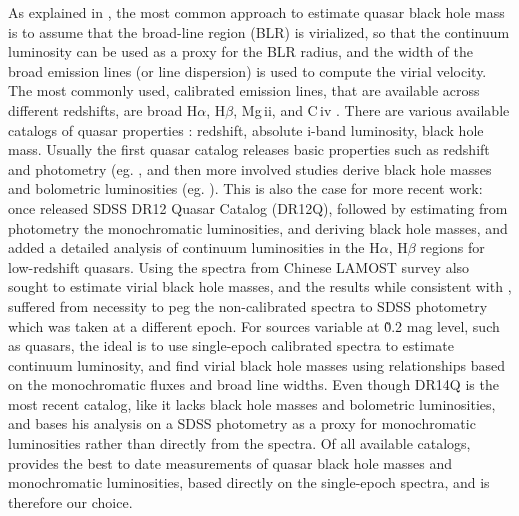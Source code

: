 \documentclass[twocolumn]{aastex62}
\begin{document}
As explained in \citep{shen2008,shen2011}, the most common approach to estimate quasar black hole mass is to assume that the broad-line region (BLR) is virialized, so that the continuum luminosity can be used as a proxy for the BLR radius, and the width of the broad emission lines (or line dispersion) is used to compute the virial velocity. The most commonly used, calibrated emission lines, that are available across different redshifts, are broad H$\alpha$, H$\beta$, Mg\,{\sc ii}, and C\,{\sc iv} \citep{vestergaard2002}. 
There are various available catalogs of quasar properties : redshift, absolute i-band luminosity, black hole mass.  Usually the first quasar catalog releases basic properties such as redshift and photometry (eg. \citealt{schneider2007, schneider2010}, and then more involved studies derive black hole masses and bolometric luminosities (eg. \citealt{shen2008, shen2011}). This is also the case for more recent work:  once \citep{paris2017} released SDSS DR12 Quasar Catalog (DR12Q),  \citep{kozlowski2017a} followed by estimating from photometry the monochromatic luminosities,  and  deriving black hole masses, and \citep{chen2018} added a detailed analysis of continuum luminosities in the  H$\alpha$, H$\beta$ regions for low-redshift quasars. Using the spectra from Chinese LAMOST survey \citep{dong2018} also sought to estimate virial black hole masses, and the results while consistent with \citep{shen2011}, suffered from necessity to peg the non-calibrated spectra to SDSS photometry which was taken at a different epoch.  For sources variable at \~0.2 mag level, such as quasars, the ideal is to use single-epoch calibrated spectra to estimate continuum luminosity, and find virial black hole masses using relationships based on the monochromatic fluxes and broad line widths. Even though \cite{paris2018} DR14Q is the most recent catalog, like \citep{paris2017} it lacks black hole masses and bolometric luminosities, and \citep{kozlowski2017a}  bases his analysis on a SDSS photometry as a proxy for monochromatic luminosities rather than directly from the spectra. Of all available catalogs,  \citep{shen2011} provides the best to date measurements of quasar black hole masses and monochromatic luminosities, based directly on the single-epoch spectra, and is therefore our choice. 
\end{document}

